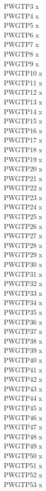 \documentclass[12pt]{article}
\begin{document}
PWGTP3 x\\
PWGTP4 x\\
PWGTP5 x\\
PWGTP6 x\\
PWGTP7 x\\
PWGTP8 x\\
PWGTP9 x\\
PWGTP10 x\\
PWGTP11 x\\
PWGTP12 x\\
PWGTP13 x\\
PWGTP14 x\\
PWGTP15 x\\
PWGTP16 x\\
PWGTP17 x\\
PWGTP18 x\\
PWGTP19 x\\
PWGTP20 x\\
PWGTP21 x\\
PWGTP22 x\\
PWGTP23 x\\
PWGTP24 x\\
PWGTP25 x\\
PWGTP26 x\\
PWGTP27 x\\
PWGTP28 x\\
PWGTP29 x\\
PWGTP30 x\\
PWGTP31 x\\
PWGTP32 x\\
PWGTP33 x\\
PWGTP34 x\\
PWGTP35 x\\
PWGTP36 x\\
PWGTP37 x\\
PWGTP38 x\\
PWGTP39 x\\
PWGTP40 x\\
PWGTP41 x\\
PWGTP42 x\\
PWGTP43 x\\
PWGTP44 x\\
PWGTP45 x\\
PWGTP46 x\\
PWGTP47 x\\
PWGTP48 x\\
PWGTP49 x\\
PWGTP50 x\\
PWGTP51 x\\
PWGTP52 x\\
PWGTP53 x\\
\end{document}
